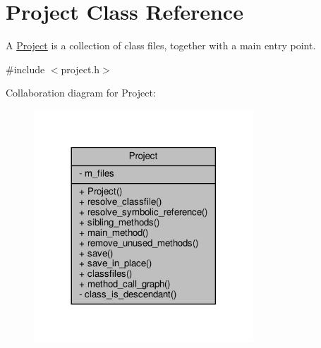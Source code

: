 \hypertarget{classProject}{}\section{Project Class Reference}
\label{classProject}


A \hyperlink{classProject}{Project} is a collection of class files, together with a main entry point.  




{\ttfamily \#include $<$project.\+h$>$}



Collaboration diagram for Project\+:
\nopagebreak
\begin{figure}[H]
\begin{center}
\leavevmode
\includegraphics[width=233pt]{classProject__coll__graph}
\end{center}
\end{figure}
